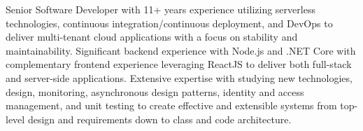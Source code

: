 \par{
    Senior Software Developer with 11+ years experience utilizing serverless technologies, continuous integration/continuous deployment, and DevOps to deliver multi-tenant cloud applications with a focus on stability and maintainability. Significant backend experience with Node.js and .NET Core with complementary frontend experience leveraging ReactJS to deliver both full-stack and server-side applications. Extensive expertise with studying new technologies, design, monitoring, asynchronous design patterns, identity and access management, and unit testing to create effective and extensible systems from top-level design and requirements down to class and code architecture.
}
